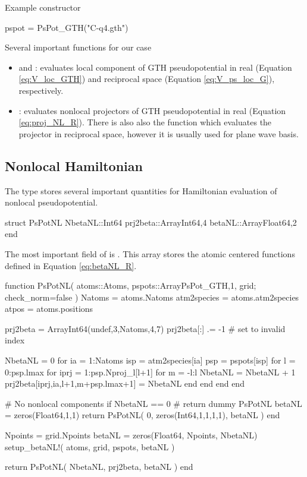 Example constructor
\begin{juliacode}
pspot = PsPot_GTH("C-q4.gth")
\end{juliacode}

Several important functions for our case
\begin{itemize}
\item {} and : evaluates local component
  of GTH pseudopotential in real (Equation \eqref{eq:V_loc_GTH})
  and reciprocal space (Equation \eqref{eq:V_ps_loc_G}), respectively.
\item {}: evaluates nonlocal projectors
  of GTH pseudopotential in real (Equation \eqref{eq:proj_NL_R}).
  There is also also the function  which evaluates the
  projector in reciprocal space, however it is usually used for plane wave basis.
\end{itemize}


\subsection{Nonlocal Hamiltonian}

The type  stores several important quantities for Hamiltonian
evaluation of nonlocal pseudopotential.
%
\begin{juliacode}
struct PsPotNL
  NbetaNL::Int64
  prj2beta::Array{Int64,4}
  betaNL::Array{Float64,2}
end
\end{juliacode}
%
The most important field of  is . This array stores
the atomic centered functions defined in Equation \eqref{eq:betaNL_R}.

\begin{juliacode}
function PsPotNL( atoms::Atoms, pspots::Array{PsPot_GTH,1}, grid; check_norm=false )
  Natoms = atoms.Natoms
  atm2species = atoms.atm2species
  atpos = atoms.positions

  prj2beta = Array{Int64}(undef,3,Natoms,4,7)
  prj2beta[:] .= -1   # set to invalid index

  NbetaNL = 0
  for ia = 1:Natoms
    isp = atm2species[ia]
    psp = pspots[isp]
    for l = 0:psp.lmax
      for iprj = 1:psp.Nproj_l[l+1]
        for m = -l:l
          NbetaNL = NbetaNL + 1
          prj2beta[iprj,ia,l+1,m+psp.lmax+1] = NbetaNL
        end
      end
    end
  end

  # No nonlocal components
  if NbetaNL == 0
    # return dummy PsPotNL
    betaNL = zeros(Float64,1,1)
    return PsPotNL( 0, zeros(Int64,1,1,1,1), betaNL )
  end

  Npoints = grid.Npoints
  betaNL = zeros(Float64, Npoints, NbetaNL)
  setup_betaNL!( atoms, grid, pspots, betaNL )

  return PsPotNL( NbetaNL, prj2beta, betaNL )
end
\end{juliacode}

